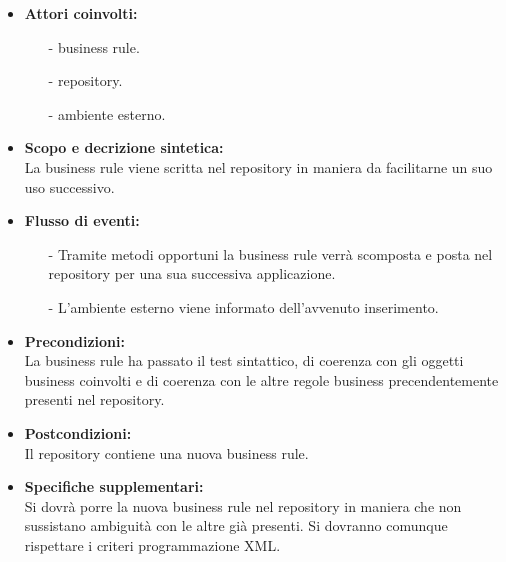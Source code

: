 \documentclass[11pt,titlepage,a4paper]{report}
\begin{document}
 \begin{itemize}
\item{\textbf{Attori coinvolti:}}
\begin{itemize}
\item[-] business rule.
\item[-] repository.
\item[-] ambiente esterno.
\end{itemize}
\item{\textbf{Scopo e decrizione sintetica:}}\\
La business rule viene scritta nel repository in maniera da facilitarne un suo uso successivo.
\item{\textbf{Flusso di eventi:}}
\begin{itemize}
 \item[-] Tramite metodi opportuni la business rule verr\`a scomposta e posta nel repository per una sua successiva applicazione.
 \item[-]L'ambiente esterno viene informato dell'avvenuto inserimento.
\end{itemize}
\item{\textbf{Precondizioni:}}\\
La business rule ha passato il test sintattico, di coerenza con gli oggetti business coinvolti e di coerenza con le altre regole business precendentemente presenti nel repository.
\item{\textbf{Postcondizioni:}}\\
Il repository contiene una nuova business rule.
\item\textbf{{Specifiche supplementari:}}\\
Si dovr\`a porre la nuova business rule nel repository in maniera che non sussistano ambiguit\`a con le altre gi\`a presenti.
Si dovranno comunque rispettare i criteri programmazione XML.

\end{itemize}
\end{document}
